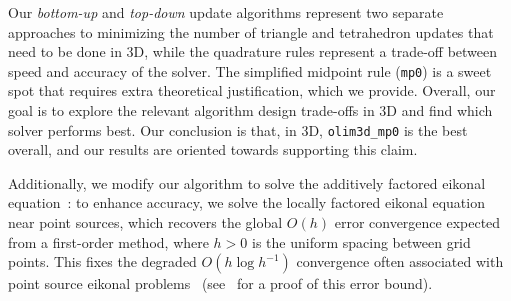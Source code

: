 \documentclass[smallcondensed]{svjour3}
\begin{document}
Our \emph{bottom-up} and \emph{top-down} update algorithms
represent two separate approaches to minimizing the number of triangle
and tetrahedron updates that need to be done in 3D, while the
quadrature rules represent a trade-off between speed and accuracy of
the solver. The simplified midpoint rule (\texttt{mp0}) is a sweet
spot that requires extra theoretical justification, which we
provide. Overall, our goal is to explore the relevant algorithm design
trade-offs in 3D and find which solver performs best. Our conclusion
is that, in 3D, \texttt{olim3d\_mp0} is the best overall, and our
results are oriented towards supporting this claim.

Additionally, we modify our algorithm to solve the additively factored
eikonal equation~\cite{luo2012fast}: to enhance accuracy, we solve the
locally factored eikonal equation near point sources, which recovers
the global $O(h)$ error convergence expected from a first-order
method, where $h > 0$ is the uniform spacing between grid points. This
fixes the degraded $O(h \log h^{-1})$ convergence often associated
with point source eikonal problems~\cite{qi2018corner}
(see~\cite{zhao2005fast} for a proof of this error bound).
\end{document}
